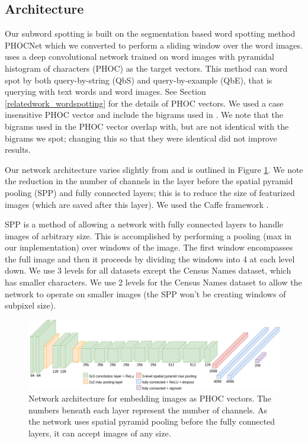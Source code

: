 \documentclass[ms,electronic,twosidetoc,letterpaper,chaptercenter,parttop,lol,lof,lot]{byumsphd}
\begin{document}
\subsection{Architecture}

Our subword spotting is built on the segmentation based word spotting method PHOCNet \cite{sudholt2016} which we converted to perform a sliding window over the word images. \cite{sudholt2016} uses a deep convolutional network trained on word images with pyramidal histogram of characters (PHOC) \cite{Almazan2014} as the target vectors. This method can word spot by both query-by-string (QbS) and query-by-example (QbE), that is querying with text words and word images. See Section \ref{relatedwork_wordspotting} for the details of PHOC vectors. We used a case insensitive PHOC vector and include the bigrams used in \cite{sudholt2016}. We note that the bigrams used in the PHOC vector overlap with, but are not identical with the bigrams we spot; changing this so that they were identical did not improve results. 



Our network architecture varies slightly from \cite{sudholt2016} and is outlined in Figure \ref{fig:network}. We note the reduction in the number of channels in the layer before the spatial pyramid pooling (SPP) and fully connected layers; this is to reduce the size of featurized images (which are saved after this layer).  We used the Caffe framework \cite{caffe}.

SPP \cite{SPP} is a method of allowing a network with fully connected layers to handle images of arbitrary size. This is accomplished by performing a pooling (max in our implementation) over windows of the image. The first window encompasses the full image and then it proceeds by dividing the windows into 4 at each level down. We use 3 levels for all datasets except the Census Names dataset, which has smaller characters. We use 2 levels for the Census Names dataset to allow the network to operate on smaller images (the SPP won't be creating windows of subpixel size).


\begin{figure}[t]
    \centering
    \includegraphics[width=.98\textwidth]{thesis-phocnet}
    \caption{Network architecture for embedding images as PHOC vectors. The numbers beneath each layer represent the number of channels. As the network uses spatial pyramid pooling before the fully connected layers, it can accept images of any size.}
    \label{fig:network}
\end{figure}
\end{document}
